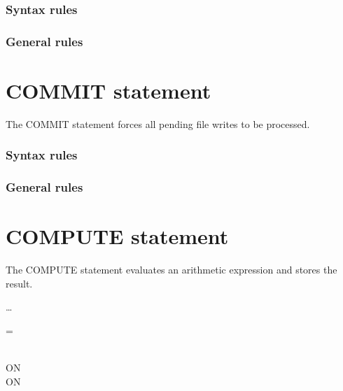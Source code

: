 \begin{syntax}[\miscextcolour]
\end{syntax}

\subsubsection{Syntax rules}

\subsubsection{General rules}

\section{COMMIT statement}

The COMMIT statement forces all pending file writes to be processed.

\begin{syntax}[\miscextcolour]
\end{syntax}

\subsubsection{Syntax rules}

\subsubsection{General rules}

\section{COMPUTE statement}

The COMPUTE statement evaluates an arithmetic expression and stores the result.

\begin{syntax}
  \begin{1=}
    \identifier
    \begin{0-1}
    \end{0-1}
  \end{1=} \ldots
  \begin{1=}
    = \\
     \\
  \end{1=}
  \arithmeticexpression

  \begin{0+}
    ON   \imperativestatement \\
     ON   \imperativestatement
  \end{0+}

  \begin{0-1}
  \end{0-1}
\end{syntax}

